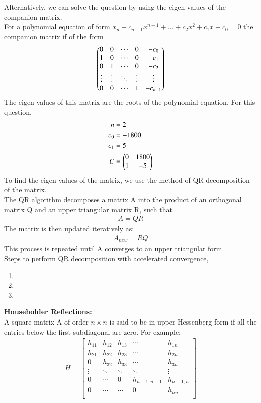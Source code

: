 \documentclass[journal, article]{IEEEtran}
\begin{document}
Alternatively, we can solve the question by using the eigen values of the companion matrix.\\
For a polynomial equation of form $x_n+c_{n-1}x^{n-1}+\dots+c_2x^2+c_1x+c_0 = 0$ the companion matrix if of the form
\begin{align}
	\begin{pmatrix}
		0 & 0 & \cdots & 0 & -c_0\\
		1 & 0 & \cdots & 0 & -c_1\\
		0 & 1 & \cdots & 0 & -c_2\\
		\vdots & \vdots & \ddots & \vdots & \vdots\\
		0 & 0 & \cdots & 1 & -c_{n-1}\\
	\end{pmatrix}
\end{align}
The eigen values of this matrix are the roots of the polynomial equation. For this question,
\begin{align}
	n &= 2\\
	c_0 &= -1800\\
	c_1 &= 5\\
	C &= \begin{pmatrix}0 & 1800 \\ 1 & -5\end{pmatrix}
\end{align}
To find the eigen values of the matrix, we use the method of QR decomposition of the matrix.\\
The QR algorithm decomposes a matrix A into the product of an orthogonal matrix Q and an upper triangular matrix R, such that
\begin{align}
	A = QR
\end{align}
The matrix is then updated iteratively as:
\begin{align}
	A_{new} = RQ
\end{align}
This process is repeated until A converges to an upper triangular form.\\
Steps to perform QR decomposition with accelerated convergence,\\
\begin{enumerate}
	\item {}
	\item {}
	\item {}
\end{enumerate}
\textbf{Householder Reflections:}\\
A square matrix A of order $n \times n$ is said to be in upper Hessenberg form if all the entries below the first subdiagonal are zero.
For example:
\begin{align}
	H = 
	\begin{bmatrix}
		h_{11} & h_{12} & h_{13} & \cdots & h_{1n} \\
		h_{21} & h_{22} & h_{23} & \cdots & h_{2n} \\
		0      & h_{32} & h_{33} & \cdots & h_{3n} \\
		\vdots & \ddots & \ddots & \ddots & \vdots \\
		0      & \cdots & 0      & h_{n-1,n-1} & h_{n-1,n} \\
		0      & \cdots & \cdots & 0          & h_{nn} \\
	\end{bmatrix}
\end{align}
\end{document}
